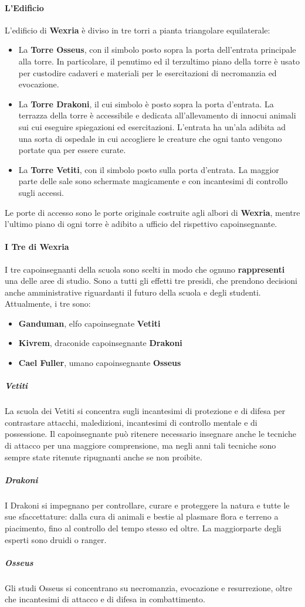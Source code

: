 \documentclass[10pt,twoside,onecolumn,openany]{book}
\begin{document}
\paragraph{L'Edificio}
L'edificio di \textbf{Wexria} è diviso in tre torri a pianta triangolare equilaterale:
\begin{itemize}
\item La \textbf{Torre Osseus}, con il simbolo posto sopra la porta dell'entrata principale alla torre. In particolare, il penutimo ed il terzultimo piano della torre è usato per custodire cadaveri e materiali per le esercitazioni di necromanzia ed evocazione.
\item La \textbf{Torre Drakoni}, il cui simbolo è posto sopra la porta d'entrata. La terrazza della torre è accessibile e dedicata all'allevamento di innocui animali sui cui eseguire spiegazioni ed esercitazioni. L'entrata ha un'ala adibita ad una sorta di ospedale in cui accogliere le creature che ogni tanto vengono portate qua per essere curate.
\item La \textbf{Torre Vetiti}, con il simbolo posto sulla porta d'entrata. La maggior parte delle sale sono schermate magicamente e con incantesimi di controllo sugli accessi.
\end{itemize}
Le porte di accesso sono le porte originale costruite agli albori di \textbf{Wexria}, mentre l'ultimo piano di ogni torre è adibito a ufficio del rispettivo capoinsegnante.
\paragraph{I Tre di Wexria}
I tre capoinsegnanti della scuola sono scelti in modo che ognuno \textbf{rappresenti} una delle aree di studio. Sono a tutti gli effetti tre presidi, che prendono decisioni anche amministrative riguardanti il futuro della scuola e degli studenti.\\
Attualmente, i tre sono:
\begin{itemize}
\item \textbf{Ganduman}, elfo capoinsegnate \textbf{Vetiti}
\item \textbf{Kivrem}, draconide capoinsegnante \textbf{Drakoni}
\item \textbf{Cael Fuller}, umano capoinsegnante \textbf{Osseus}
\end{itemize}
\subparagraph{Vetiti} La scuola dei Vetiti si concentra sugli incantesimi di protezione e di difesa per contrastare attacchi, maledizioni, incantesimi di controllo mentale e di possessione. Il capoinsegnante può ritenere necessario insegnare anche le tecniche di attacco per una maggiore comprensione, ma negli anni tali tecniche sono sempre state ritenute ripugnanti anche se non proibite.
\subparagraph{Drakoni} I Drakoni si impegnano per controllare, curare e proteggere la natura e tutte le sue sfaccettature: dalla cura di animali e bestie al plasmare flora e terreno a piacimento, fino al controllo del tempo stesso ed oltre. La maggiorparte degli esperti sono druidi o ranger.
\subparagraph{Osseus} Gli studi Osseus si concentrano su necromanzia, evocazione e resurrezione, oltre che incantesimi di attacco e di difesa in combattimento.
\end{document}
